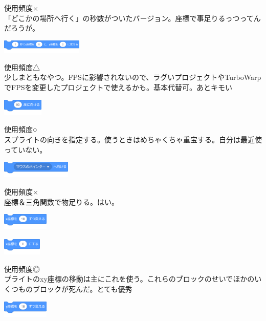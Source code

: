 \documentclass[b5paper,10pt]{jsarticle}
\begin{document}
\begin{multicols*}{3}
\begin{itembox}{5}
\end{itembox}
使用頻度×\\
「どこかの場所へ行く」の秒数がついたバージョン。座標で事足りるっつってんだろうが。
\begin{itembox}{6}
\includegraphics[width=39mm]{images/motion_7.png}
\end{itembox}
使用頻度△\\
少しまともなやつ。FPSに影響されないので、ラグいプロジェクトやTurboWarpでFPSを変更したプロジェクトで使えるかも。基本代替可。あとキモい
\begin{itembox}{7}
\includegraphics[height=8mm]{images/motion_8.png}
\end{itembox}
使用頻度○\\
スプライトの向きを指定する。使うときはめちゃくちゃ重宝する。自分は最近使っていない。
\begin{itembox}{8}
\includegraphics[height=8mm]{images/motion_9.png}
\end{itembox}
使用頻度×\\
座標＆三角関数で物足りる。はい。
\begin{itembox}{9}
\includegraphics[height=8mm]{images/motion_10.png}

\includegraphics[height=8mm]{images/motion_11.png}
\end{itembox}
使用頻度◎\\
プライトのxy座標の移動は主にこれを使う。これらのブロックのせいでほかのいくつものブロックが死んだ。とても優秀
\begin{itembox}{10}
\includegraphics[height=8mm]{images/motion_12.png}


\end{itembox}
\end{multicols*}
\end{document}
